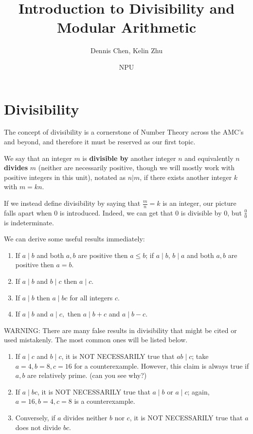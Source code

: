 \documentclass[mast]{lucky}
\title{Introduction to Divisibility and Modular Arithmetic}
\author{Dennis Chen, Kelin Zhu}
\date{NPU}
\begin{document}
\maketitle
\section{Divisibility}
The concept of divisibility is a cornerstone of Number Theory across the AMC's and beyond, and therefore it must be reserved as our first topic.
\begin{defi}[Divisibility]
We say that an integer $m$ is \textbf{divisible by} another integer $n$ and equivalently $n$ \textbf{divides} $m$ (neither are necessarily positive, though we will mostly work with positive integers in this unit), notated as $n|m$, if there exists another integer $k$ with $m=kn$.
\end{defi}
\begin{remark}
If we instead define divisibility by saying that $\frac{m}{n}=k$ is an integer, our picture falls apart when 0 is introduced. Indeed, we can get that $0$ is divisible by $0$, but $\frac{0}{0}$ is indeterminate.
\end{remark}

We can derive some useful results immediately:
\begin{fact}
\hfill
\begin{enumerate}
    \item If $a\mid b$ and both $a,b$ are positive then $a\le b$; if $a\mid b$, $b\mid a$ and both $a,b$ are positive then $a=b$.
    \item If $a\mid b$ and $b\mid c$ then $a\mid c.$
    \item If $a\mid b$ then $a\mid bc$ for all integers $c.$
    \item If $a\mid b$ and $a\mid c,$ then $a\mid b+c$ and $a\mid b-c$.
\end{enumerate}
\end{fact}

WARNING: There are many false results in divisibility that might be cited or used mistakenly. The most common ones will be listed below.
\begin{enumerate}
\item If $a\mid c$ and $b\mid c$, it is NOT NECESSARILY true that $ab\mid c$; take $a=4,b=8,c=16$ for a counterexample. However, this claim is always true if $a,b$ are relatively prime. (can you see why?)
\item If $a\mid bc$, it is NOT NECESSARILY true that $a\mid b$ or $a\mid c$; again, $a=16, b=4, c=8$ is a counterexample.
\item Conversely, if $a$ divides neither $b$ nor $c$, it is NOT NECESSARILY true that $a$ does not divide $bc$.
\end{enumerate}
\end{document}
